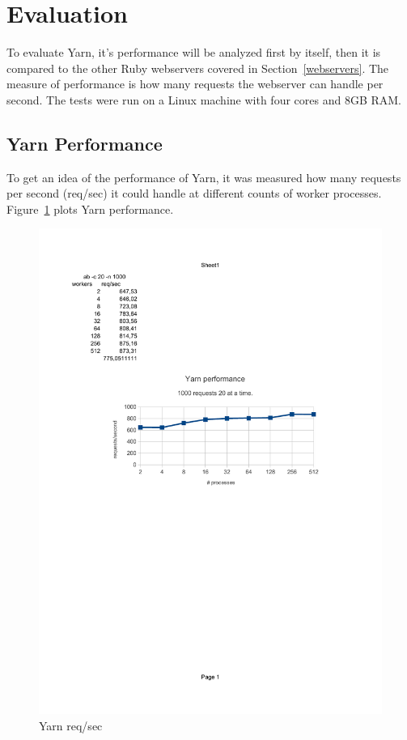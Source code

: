 \section{Evaluation}
\label{eval}
To evaluate Yarn, it's performance will be analyzed first by itself, then it
is compared to the other Ruby webservers covered in Section~\ref{webservers}.
The measure of performance is how many requests the webserver can handle per
second. The tests were run on a Linux machine with four cores and 8GB RAM.

\subsection{Yarn Performance}
To get an idea of the performance of Yarn, it was measured how many requests
per second (req/sec) it could handle at different counts of worker processes.
Figure~\ref{optwork} plots Yarn performance.

\begin{figure}[htb]
  \centering
  \includegraphics[width=1.0\textwidth]{results/optimal_workers_crop.pdf}
  \caption{Yarn req/sec}
  \label{optwork}
\end{figure}

